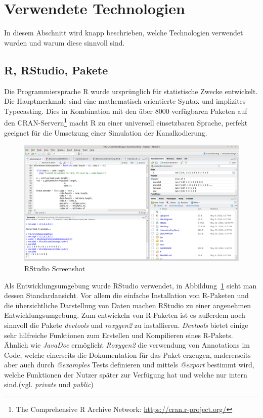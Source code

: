
\section{Verwendete Technologien}
\label{section:technologies}

In diesem Abschnitt wird knapp beschrieben, welche Technologien verwendet wurden und warum diese sinnvoll sind.

\subsection{R, RStudio, Pakete}

Die Programmiersprache R wurde ursprünglich für statistische Zwecke entwickelt. Die Hauptmerkmale sind eine mathematisch orientierte Syntax und implizites Typecasting. Dies in Kombination mit den über 8000 verfügbaren Paketen auf den CRAN-Servern\footnote{The Comprehensive R Archive Network: \url{https://cran.r-project.org/}} macht R zu einer universell einsetzbaren Sprache, perfekt geeignet für die Umsetzung einer Simulation der Kanalkodierung.\cite{rmanual}

\begin{figure}[t]
\centering
\includegraphics[width=\ScaleIfNeeded]{pictures/rstudio}
\caption{RStudio Screenshot}
\label{pic:rstudio}
\end{figure}

Als Entwicklungsumgebung wurde RStudio verwendet, in Abbildung~\ref{pic:rstudio} sieht man dessen Standardansicht. Vor allem die einfache Installation von R-Paketen und die übersichtliche Darstellung von Daten machen RStudio zu einer angenehmen Entwicklungsumgebung. Zum entwickeln von R-Paketen ist es außerdem noch sinnvoll die Pakete \emph{devtools} und \emph{roxygen2} zu installieren. \emph{Devtools} bietet einige sehr hilfreiche Funktionen zum Erstellen und Kompilieren eines R-Pakets.\cite{devtools} Ähnlich wie \emph{JavaDoc} ermöglicht \emph{Roxygen2} die verwendung von Annotations im Code, welche einerseits die Dokumentation für das Paket erzeugen, andererseits aber auch durch \emph{@examples} Tests definieren und mittels \emph{@export} bestimmt wird, welche Funktionen der Nutzer später zur Verfügung hat und welche nur intern sind.(vgl. \emph{private} und \emph{public})\cite{roxygen}

